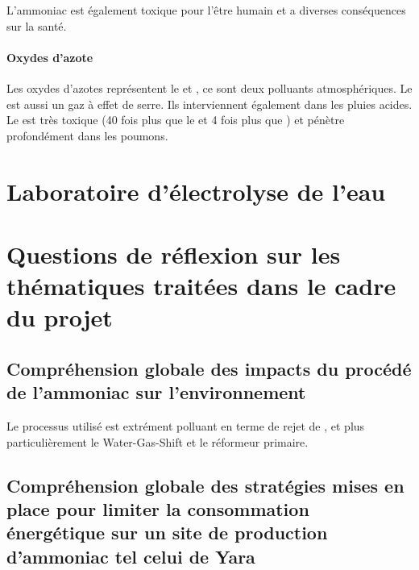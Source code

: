 L'ammoniac est également toxique pour l'être humain et a
diverses conséquences sur la santé.
\paragraph{Oxydes d'azote} Les oxydes d'azotes 
représentent le  et , ce sont
deux polluants atmosphériques. Le  est aussi
un gaz à effet de serre. Ils interviennent également
dans les pluies acides.
Le  est très toxique (40 fois plus que le
 et 4 fois plus que ) et
pénètre profondément dans les poumons.

\section{Laboratoire d'électrolyse de l'eau}

\section{Questions de réflexion sur les thématiques traitées
dans le cadre du projet}
\subsection{Compréhension globale des impacts du procédé de l'ammoniac sur l'environnement}
Le processus utilisé est extrément polluant en terme de rejet de , et
plus particulièrement le Water-Gas-Shift et le réformeur primaire.
\subsection{Compréhension globale des stratégies mises en place pour limiter la consommation 
énergétique sur un site de production d'ammoniac tel celui de Yara}


